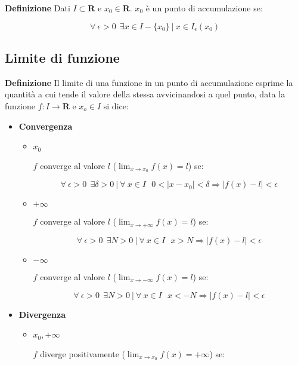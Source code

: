 \documentclass{article}
\begin{document}
\noindent\textbf{Definizione} Dati $I\subset\mathbf{R}$ e $x_0\in \mathbf{R}$. $x_0$ è un punto di accumulazione se:

$$\forall\ \epsilon>0\ \ \exists x\in I-\{x_0\}\ |\ x\in I_\epsilon(x_0)$$\newline

\subsection{Limite di funzione}

\textbf{Definizione} Il limite di una funzione in un punto di accumulazione esprime la quantità a cui tende il valore della stessa avvicinandosi a quel punto, data la funzione $f:I\rightarrow\mathbf{R}$ e $x_o\in I$ si dice:
\begin{itemize}
    \item \textbf{Convergenza}
    \begin{itemize}
        \item \textbf{$x_0$}

        $f$ converge al valore $l$ ($\lim_{x\rightarrow x_0}f(x)=l$) se:
        
        $$\forall\ \epsilon>0\ \ \exists\delta>0\ |\ \forall\ x\in I\ \ \ 0<|x-x_0|<\delta\Rightarrow|f(x)-l|<\epsilon$$

        \item \textbf{$+\infty$}

        $f$ converge al valore $l$ ($\lim_{x\rightarrow +\infty}f(x)=l$) se:
        
        $$\forall\ \epsilon>0 \ \ \exists N>0\ |\ \forall\ x\in I\ \ \ x>N\Rightarrow |f(x)-l|<\epsilon$$

        \item \textbf{$-\infty$}

        $f$ converge al valore $l$ ($\lim_{x\rightarrow -\infty}f(x)=l$) se:
        
        $$\forall\ \epsilon>0 \ \ \exists N>0\ |\ \forall\ x\in I\ \ \ x<-N\Rightarrow |f(x)-l|<\epsilon$$\newline
        
    \end{itemize}

    \item \textbf{Divergenza}
    \begin{itemize}
        \item \textbf{$x_0,+\infty$}

        $f$ diverge positivamente ($\lim_{x\rightarrow x_0}f(x)=+\infty$) se:
        

\end{itemize}
\end{itemize}
\end{document}
